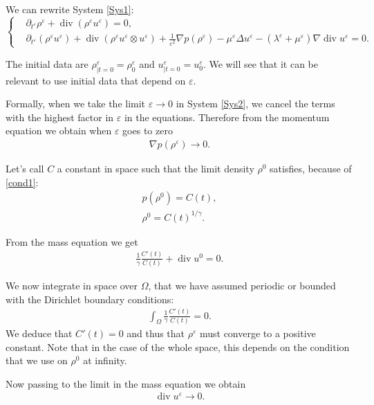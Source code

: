 \documentclass[11pt, twoside, a4paper]{article}
\theoremstyle{plain}
\theoremstyle{remark}
\numberwithin{equation}{section}
\renewcommand{\div}{\operatorname{div}}
\newcommand{\eps}{\varepsilon}
\begin{document}
We can rewrite System \eqref{Sys1}: 
\begin{equation}
\left\{
\begin{aligned}\label{Sys2}
    &\partial_{t^\eps} \rho^\eps + \div (\rho^\eps u^\eps) = 0,\\
    &\partial_{t^\eps} (\rho^\eps u^\eps) + \div (\rho^\eps u^\eps \otimes u^\eps) + \frac{1}{\eps^2}\nabla p(\rho^\eps) - \mu^\eps \Delta u^\eps - (\lambda^\eps + \mu^\eps)\nabla \div u^\eps =0.
\end{aligned}
\right.
\end{equation}

The initial data are $\rho^\eps_{\lvert t=0 }=\rho^\eps_0$ and $u^\eps_{\lvert t=0 }=u^\eps_0$. We will see that it can be relevant to use initial data that depend on $\eps$.

Formally, when we take the limit $\eps \to 0$ in System \eqref{Sys2}, we cancel the terms with the highest factor in $\eps$ in the equations. Therefore from the momentum equation we obtain when $\eps$ goes to zero
\begin{align}
    \nabla p(\rho^\eps) \to 0 \label{cond1}.
\end{align}

Let's call $C$ a constant in space such that the limit density $\rho^0$ satisfies, because of \eqref{cond1}:
\begin{align*}
    p(\rho^0) = C(t),\\
    \rho^0 = C(t)^{1/\gamma}.
\end{align*}

From the mass equation we get
\begin{align*}
    \frac{1}{\gamma} \frac{C'(t)}{C(t)} + \div u^0 = 0.
\end{align*}

We now integrate in space over $\Omega$, that we have assumed periodic or bounded with the Dirichlet boundary conditions:
\begin{align*}
    \int_\Omega \frac{1}{\gamma} \frac{C'(t)}{C(t)} = 0.
\end{align*}
We deduce that $C'(t)=0$ and thus that $\rho^\eps$ must converge to a positive constant. Note that in the case of the whole space, this depends on the condition that we use on $\rho^0$ at infinity.

Now passing to the limit in the mass equation we obtain
\begin{align}
    \div u^\eps \to 0\label{cond2}.
\end{align}
\end{document}
